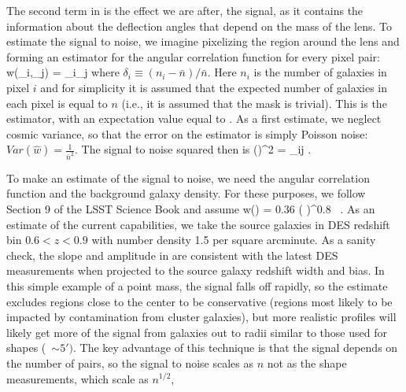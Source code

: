The second term in  is the effect we are after, the signal,
as it contains the information about the deflection angles that
depend on the mass of the lens. To estimate the signal to noise, we
imagine pixelizing the region around the lens and forming an
estimator for the angular correlation function for every pixel pair:
\be \hat w(\vec\theta_i,\vec\theta_j) = \delta_i\delta_j \ee where
$\delta_i\equiv (n_i-\bar n)/\bar n$. Here $n_i$ is the number of
galaxies in pixel $i$ and for simplicity it is assumed that the
expected number of galaxies in each pixel is equal to $n$ (i.e., it
is assumed that the mask is trivial). This is the
\citet{1993ApJ...412...64L} estimator, with an expectation value equal to
.  As a first estimate, we neglect cosmic variance, so
that the error on the estimator is simply Poisson noise:  $Var(\hat w) = \frac{1}{\bar n^2}$. The signal to noise squared
then is \be \left(\right)^2 = \sum_{ij}
 .\ee




To make an estimate of the signal to noise, we need the angular
correlation function and the background galaxy density.  For these
purposes, we follow Section 9 of the LSST Science Book and assume \be
w(\theta) = 0.36 \left(  \right)^{0.8} \,
. \ee As an estimate of the current
capabilities, we take the source galaxies in DES  redshift bin
$0.6<z<0.9$ with number density 1.5 per square arcminute. As
a sanity check, the slope and amplitude in  are consistent
with the latest DES measurements \citep{Elvin-Poole:2017xsf} when
projected to the source galaxy redshift width and bias.  In this
simple example of a point mass, the signal falls off rapidly, so the
estimate excludes regions close to the center to be conservative
(regions most likely to be impacted by contamination
from cluster galaxies), but more realistic profiles will likely get
more of the signal from galaxies out to radii similar to those used
for shapes (~$\sim 5')$. The key advantage of this technique is that
the signal depends on the number of pairs, so the signal to noise
scales as $n$ not as the shape measurements, which scale as $n^{1/2}$,


